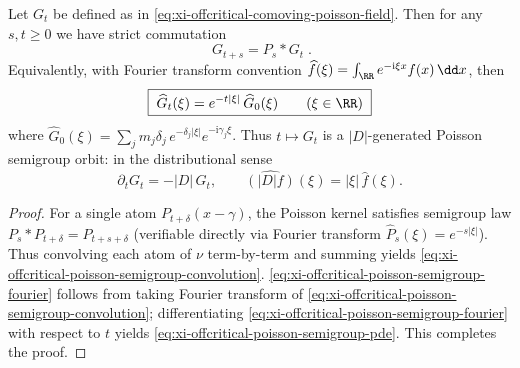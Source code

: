\begin{theorem}\label{thm:xi-offcritical-poisson-semigroup-homomorphism}
Let \(G_t\) be defined as in \eqref{eq:xi-offcritical-comoving-poisson-field}.
Then for any \(s,t\ge 0\) we have strict commutation
\begin{equation}\label{eq:xi-offcritical-poisson-semigroup-convolution}
\boxed{\;G_{t+s}=P_s*G_t\; }.
\end{equation}
Equivalently, with Fourier transform convention \(\widehat f(\xi)=\int_{\RR}e^{-\mathrm{i}\xi x}f(x)\,\dd x\), then
\begin{equation}\label{eq:xi-offcritical-poisson-semigroup-fourier}
\boxed{\;
\widehat G_t(\xi)=e^{-t|\xi|}\,\widehat G_0(\xi)\qquad(\xi\in\RR)\;}
\end{equation}
where \(\widehat G_0(\xi)=\sum_{j}m_j\delta_j\,e^{-\delta_j|\xi|}e^{-\mathrm{i}\gamma_j\xi}\).
Thus \(t\mapsto G_t\) is a \(|D|\)-generated Poisson semigroup orbit: in the distributional sense
\begin{equation}\label{eq:xi-offcritical-poisson-semigroup-pde}
\boxed{\;\partial_tG_t=-|D|\,G_t,\qquad
\widehat{(|D|f)}(\xi)=|\xi|\,\widehat f(\xi).\;}
\end{equation}
\end{theorem}

\begin{proof}
For a single atom \(P_{t+\delta}(x-\gamma)\), the Poisson kernel satisfies semigroup law \(P_s*P_{t+\delta}=P_{t+s+\delta}\) (verifiable directly via Fourier transform \(\widehat P_s(\xi)=e^{-s|\xi|}\)).
Thus convolving each atom of \(\nu\) term-by-term and summing yields \eqref{eq:xi-offcritical-poisson-semigroup-convolution}.
\eqref{eq:xi-offcritical-poisson-semigroup-fourier} follows from taking Fourier transform of \eqref{eq:xi-offcritical-poisson-semigroup-convolution}; differentiating \eqref{eq:xi-offcritical-poisson-semigroup-fourier} with respect to \(t\) yields \eqref{eq:xi-offcritical-poisson-semigroup-pde}. This completes the proof.
\end{proof}

